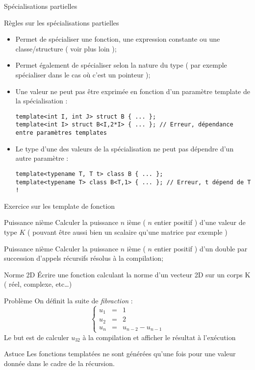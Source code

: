 \documentclass[handout,10pt]{beamer}
\begin{document}
\begin{frame}[fragile]{Spécialisations partielles}
\begin{block}{Règles sur les spécialisations partielles}
\begin{itemize}
\item Permet de spécialiser une fonction, une expression constante ou une classe/structure ( voir plus loin );
\item Permet également de spécialiser selon la nature du type ( par exemple spécialiser dans le cas où c'est un pointeur );
\item Une valeur ne peut pas être exprimée en fonction d'un paramètre template de la spécialisation :
\begin{lstlisting}
template<int I, int J> struct B { ... };
template<int I> struct B<I,2*I> { ... }; // Erreur, dépendance entre paramètres templates
\end{lstlisting}
\item Le type d'une des valeurs de la spécialisation ne peut pas dépendre d'un autre paramètre :
\begin{lstlisting}
template<typename T, T t> class B { ... };
template<typename T> class B<T,1> { ... }; // Erreur, t dépend de T !
\end{lstlisting}
\end{itemize}
\end{block}
\end{frame}

\begin{frame}[fragile]{Exercice sur les template de fonction}
\tiny
\begin{exampleblock}{Puissance nième}
Calculer la puissance $n$ ième ( $n$ entier positif ) d'une valeur de type $K$ ( pouvant être aussi bien un scalaire qu'une matrice par exemple )
\end{exampleblock}

\begin{exampleblock}{Puissance nième}
Calculer la puissance $n$ ième ( $n$ entier positif ) d'un double par succession d'appels récursifs résolus à la compilation;
\end{exampleblock}

\begin{exampleblock}{Norme 2D}
Écrire une fonction calculant la norme d'un vecteur 2D sur un corps K ( réel, complexe, etc\ldots)
\end{exampleblock}

\begin{exampleblock}{Problème}
On définit la suite de \textsl{fibraction} :
\[
\left\{
\begin{array}{rcl}
u_{1} & = & 1 \\
u_{2} & = & 2 \\
u_{n} & = & u_{n-2} - u_{n-1}
\end{array}
\right.
\]
Le but est de calculer $u_{32}$ à la compilation et afficher le résultat à l'exécution
\begin{block}{Astuce}
Les fonctions templatées ne sont générées qu'une fois pour une valeur donnée dans le cadre de la récursion.
\end{block}
\end{exampleblock}
\end{frame}
\end{document}
